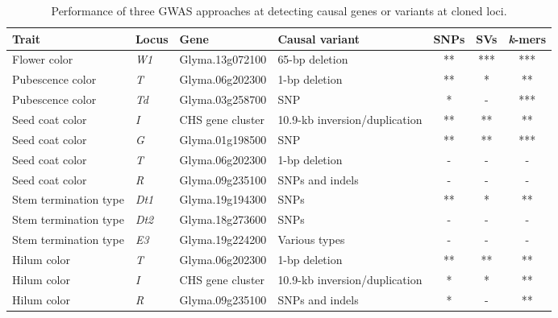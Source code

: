 \documentclass{article}
\begin{document}
\begin{landscape}
\begin{table}
	\caption[Performance of three GWAS approaches at detecting causal genes/variants]%
	{Performance of three GWAS approaches at detecting causal genes or variants at cloned loci.}
	\label{loci-table}

	\footnotesize
	\centering
	\begin{threeparttable}
		\begin{tabular}{llllccc}
		\toprule Trait & Locus & Gene & Causal variant & SNPs\tnote{a} & SVs\tnote{b} & \textit{k}-mers \\ \midrule
		Flower color & \textit{W1} & Glyma.13g072100 & 65-bp deletion \shortcite{zabala2007} & ** & *** & *** \\
		Pubescence color & \textit{T} & Glyma.06g202300 & 1-bp deletion \shortcite{zabala2003} & ** & * & ** \\
		Pubescence color & \textit{Td} & Glyma.03g258700 & SNP \shortcite{yan2020} & * & - & *** \\
		Seed coat color & \textit{I} & CHS gene cluster & 10.9-kb inversion/duplication \shortcite{tuteja2008} & ** & ** & ** \\
		Seed coat color & \textit{G} & Glyma.01g198500 & SNP \shortcite{wang2018} & ** & ** & *** \\
		Seed coat color\tnote{c} & \textit{T} & Glyma.06g202300 & 1-bp deletion \shortcite{zabala2003} & - & - & - \\
		Seed coat color\tnote{c} & \textit{R} & Glyma.09g235100 & SNPs and indels \shortcite{gillman2011} & - & - & - \\
		Stem termination type & \textit{Dt1} & Glyma.19g194300 & SNPs \shortcite{liu2010} & ** & * & ** \\
		Stem termination type\tnote{c} & \textit{Dt2} & Glyma.18g273600 & SNPs \shortcite{ping2014} & - & - & - \\
		Stem termination type\tnote{c} & \textit{E3} & Glyma.19g224200 & Various types \shortcite{tardivel2019} & - & - & - \\
		Hilum color\tnote{c} & \textit{T} & Glyma.06g202300 & 1-bp deletion \shortcite{zabala2003} & ** & ** & ** \\
		Hilum color\tnote{c} & \textit{I} & CHS gene cluster & 10.9-kb inversion/duplication \shortcite{tuteja2008} & * & * & ** \\
		Hilum color & \textit{R} & Glyma.09g235100 & SNPs and indels \shortcite{gillman2011} & * & - & ** \\

\end{tabular}
\end{threeparttable}
\end{table}
\end{landscape}
\end{document}

